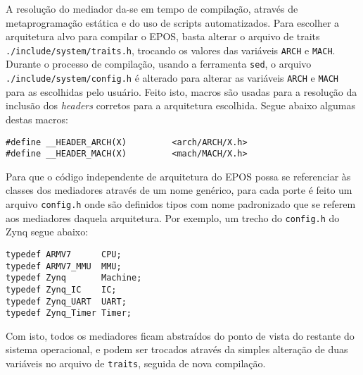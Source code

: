 
A resolução do mediador da-se em tempo de compilação, através de metaprogramação estática e do uso de scripts automatizados. Para escolher a arquitetura alvo para compilar o EPOS, basta alterar o arquivo de traits \verb+./include/system/traits.h+, trocando os valores das variáveis \verb+ARCH+ e \verb=MACH=. Durante o processo de compilação, usando a ferramenta \verb=sed=, o arquivo \verb=./include/system/config.h= é alterado para alterar as variáveis \verb+ARCH+ e \verb=MACH= para as escolhidas pelo usuário. Feito isto, macros são usadas para a resolução da inclusão dos \emph{headers} corretos para a arquitetura escolhida. Segue abaixo algumas destas macros:

\begin{verbatim}
#define __HEADER_ARCH(X)         <arch/ARCH/X.h>
#define __HEADER_MACH(X)         <mach/MACH/X.h>
\end{verbatim}

Para que o código independente de arquitetura do EPOS possa se referenciar às classes dos mediadores através de um nome genérico, para cada porte é feito um arquivo \verb=config.h= onde são definidos tipos com nome padronizado que se referem aos mediadores daquela arquitetura. Por exemplo, um trecho do \verb=config.h= do Zynq segue abaixo:

\begin{verbatim}
typedef ARMV7      CPU;
typedef ARMV7_MMU  MMU;
typedef Zynq       Machine;
typedef Zynq_IC    IC;
typedef Zynq_UART  UART;
typedef Zynq_Timer Timer;
\end{verbatim}

Com isto, todos os mediadores ficam abstraídos do ponto de vista do restante do sistema operacional, e podem ser trocados através da simples alteração de duas variáveis no arquivo de \verb=traits=, seguida de nova compilação.

